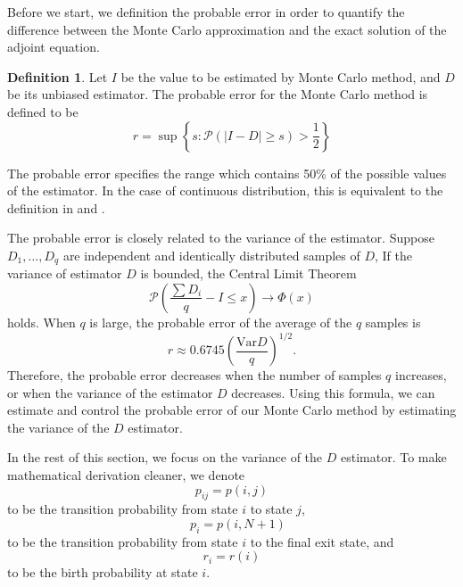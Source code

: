 \documentclass{elsart}
\theoremstyle{remark}
\theoremstyle{definition}
\newtheorem{definition}[theorem]{Definition}
\theoremstyle{proof}
\begin{document}
    Before we start, we definition the probable error in order to quantify
    the difference between the Monte Carlo approximation and the exact solution
    of the adjoint equation.
    \begin{definition}
        Let $I$ be the value to be estimated by Monte Carlo method,
        and $D$ be its unbiased estimator. The probable error for the Monte
        Carlo method is defined to be
        \begin{equation}
            r = \sup \left\{ s : \mathcal{P}\left( |I-D| \ge s \right)
                             > \frac12 \right\}
        \end{equation}
    \end{definition}
    The probable error specifies the range which contains 50\% of the possible
    values of the estimator. In the case of continuous distribution, this
    is equivalent to the definition in \cite{Tan2001} and \cite{Sobol1973}.

    The probable error is closely related to the variance of the estimator.
    Suppose $D_1, \ldots, D_q$ are independent and identically distributed
    samples of $D$, If the variance of estimator $D$ is bounded, the Central
    Limit Theorem
    \[ \mathcal{P} \left( \frac{\sum D_i}q - I \le x \right) \to \Phi(x)
    \]
    holds. When $q$ is large, the probable error of the average of the $q$
    samples is \cite{Tan2001} \cite{Tan2002}
    \begin{equation} \label{proberr}
        r \approx 0.6745 \left( \frac{\text{Var} D }{q} \right)^{1/2} .
    \end{equation}
    Therefore, the probable error decreases when the number of samples $q$
    increases, or when the variance of the estimator $D$ decreases.  Using
    this formula, we can estimate and control the probable error of our
    Monte Carlo method by estimating the variance of the $D$ estimator.
    
    In the rest of this section, we focus on the variance of the $D$ estimator.
    To make mathematical derivation cleaner, we denote \[ p_{ij} = p(i,j)\]
    to be the transition probability from state $i$ to state $j$,
    \[\quad p_i = p(i,N+1)
    \]
    to be the transition probability from state $i$ to the final exit state,
    and \[r_i = r(i)\] to be the birth probability at state $i$.
    
\end{document}
